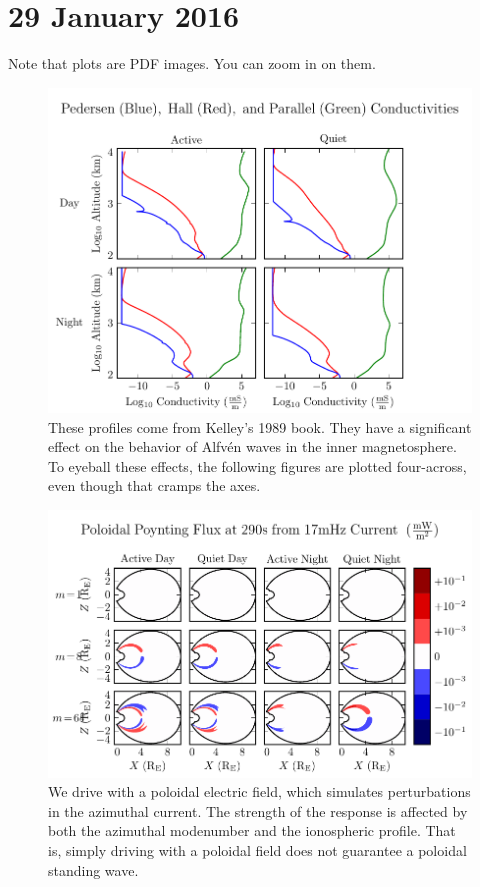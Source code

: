 \documentclass{article}
\newcommand{\Alfven}{Alfv\'en\xspace}
\begin{document}
\section{29 January 2016}

Note that plots are PDF images. You can zoom in on them. 

\begin{figure}[H]
  \includegraphics{sigma.pdf}
  \caption{These profiles come from Kelley's 1989 book. They have a significant effect on the behavior of \Alfven waves in the inner magnetosphere. To eyeball these effects, the following figures are plotted four-across, even though that cramps the axes.}
  \label{fig_sigma}
\end{figure}

\begin{figure}[H]
  \includegraphics{SP.pdf}
  \caption{We drive with a poloidal electric field, which simulates perturbations in the azimuthal current. The strength of the response is affected by both the azimuthal modenumber and the ionospheric profile. That is, simply driving with a poloidal field does not guarantee a poloidal standing wave.}
  \label{fig_SP}
\end{figure}
\end{document}
